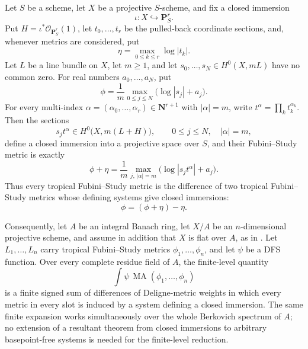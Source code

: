 
\begin{proposition}
\label{prop:p171-closed-immersion-finite-level-reduction}
Let \(S\) be a scheme, let \(X\) be a projective \(S\)-scheme, and fix a
closed immersion
\[
 \iota:X\hookrightarrow\mathbf P^r_S.
\]
Put \(H=\iota^*\mathcal O_{\mathbf P^r_S}(1)\), let
\(t_0,\ldots,t_r\) be the pulled-back coordinate sections, and, whenever
metrics are considered, put
\[
                         \eta=\max_{0\leq k\leq r}\log|t_k|.
\]
Let \(L\) be a line bundle on \(X\), let \(m\geq1\), and let
\(s_0,\ldots,s_N\in H^0(X,mL)\) have no common zero.  For real numbers
\(a_0,\ldots,a_N\), put
\[
                 \phi=\frac1m\max_{0\leq j\leq N}
                              \bigl(\log|s_j|+a_j\bigr).
\]
For every multi-index
\(\alpha=(\alpha_0,\ldots,\alpha_r)\in\mathbf N^{r+1}\) with
\(|\alpha|=m\), write \(t^\alpha=\prod_k t_k^{\alpha_k}\).  Then the
sections
\[
           s_jt^\alpha\in H^0\bigl(X,m(L+H)\bigr),
           \qquad 0\leq j\leq N,\quad |\alpha|=m,
\]
define a closed immersion into a projective space over \(S\), and their
Fubini--Study metric is exactly
\begin{equation}
\label{eq:p171-closed-immersion-metric-identity}
 \phi+\eta
 =\frac1m\max_{j,\,|\alpha|=m}
       \bigl(\log|s_jt^\alpha|+a_j\bigr).
\end{equation}
Thus every tropical Fubini--Study metric is the difference of two
tropical Fubini--Study metrics whose defining systems give closed
immersions:
\begin{equation}
\label{eq:p171-closed-immersion-difference}
                         \phi=(\phi+\eta)-\eta.
\end{equation}

Consequently, let \(A\) be an integral Banach ring, let \(X/A\) be an
\(n\)-dimensional projective scheme, and assume in addition that \(X\) is
flat over \(A\), as in
\cite[Definition~4.8 and Question~4.9]{PS23Hybrid}.  Let
\(L_1,\ldots,L_n\) carry tropical
Fubini--Study metrics \(\phi_1,\ldots,\phi_n\), and let \(\psi\) be a DFS
function.  Over every complete residue field of \(A\), the finite-level
quantity
\[
                       \int\psi\,
                       \operatorname{MA}(\phi_1,\ldots,\phi_n)
\]
is a finite signed sum of differences of Deligne-metric weights in which
every metric in every slot is induced by a system defining a closed
immersion.  The same finite expansion works simultaneously over the whole
Berkovich spectrum of \(A\); no extension of a resultant theorem from
closed immersions to arbitrary basepoint-free systems is needed for the
finite-level reduction.
\end{proposition}

